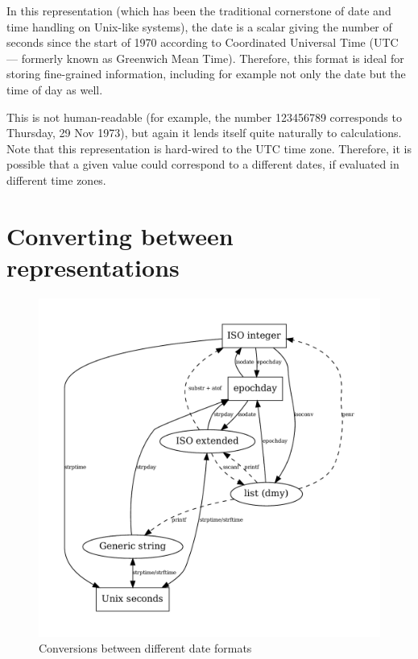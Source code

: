 In this representation (which has been the traditional cornerstone of
date and time handling on Unix-like systems), the date is a scalar
giving the number of seconds since the start of 1970 according to
Coordinated Universal Time (UTC --- formerly known as Greenwich Mean
Time). Therefore, this format is ideal for storing fine-grained
information, including for example not only the date but the time of
day as well.

This is not human-readable (for example, the number 123456789
corresponds to Thursday, 29 Nov 1973), but again it lends itself quite
naturally to calculations. Note that this representation is hard-wired
to the UTC time zone. Therefore, it is possible that a given value
could correspond to a different dates, if evaluated in different
time zones.

\section{Converting between representations}
\label{sec:cal-conversions}

\begin{figure}[htbp]
  \centering
  \includegraphics[scale=0.75]{figures/date-conversion}
  \caption{Conversions between different date formats}
  \label{fig:cal-conversions}
\end{figure}

